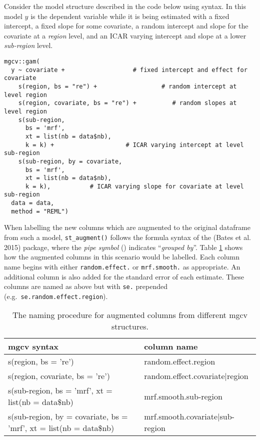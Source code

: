 Consider the model structure described in the code below using  syntax. In this model \(y\) is the dependent variable while it is being estimated with a fixed intercept, a fixed slope for some covariate, a random intercept and slope for the covariate at a \emph{region} level, and an ICAR varying intercept and slope at a lower \emph{sub-region} level.

\begin{verbatim}
mgcv::gam(
  y ~ covariate +                   # fixed intercept and effect for covariate  
    s(region, bs = "re") +                  # random intercept at level region
    s(region, covariate, bs = "re") +          # random slopes at level region
    s(sub-region, 
      bs = 'mrf',
      xt = list(nb = data$nb), 
      k = k) +                    # ICAR varying intercept at level sub-region
    s(sub-region, by = covariate, 
      bs = 'mrf',
      xt = list(nb = data$nb), 
      k = k),           # ICAR varying slope for covariate at level sub-region
  data = data, 
  method = "REML")
\end{verbatim}

When labelling the new columns which are augmented to the original dataframe from such a model, \texttt{st\_augment()} follows the formula syntax of the  (Bates et al. 2015) package, where the \emph{pipe symbol} (\texttt{\textbar{}}) indicates ``\emph{grouped by}''. Table \ref{tab:staugtab-latex} shows how the augmented columns in this scenario would be labelled. Each column name begins with either \texttt{random.effect.} or \texttt{mrf.smooth.} as appropriate. An additional column is also added for the standard error of each estimate. These columns are named as above but with \texttt{se.} prepended (e.g.~\texttt{se.random.effect.region}).

\begin{table}

\caption{\label{tab:staugtab-latex}The naming procedure for augmented columns from different mgcv structures.}
\centering
\fontsize{9}{11}\selectfont
\begin{tabular}[t]{l|l}
\hline
mgcv syntax & column name\\
\hline
s(region, bs = 're') & random.effect.region\\
\hline
s(region, covariate, bs = 're') & random.effect.covariate|region\\
\hline
s(sub-region, bs = 'mrf', xt = list(nb = data\$nb) & mrf.smooth.sub-region\\
\hline
s(sub-region, by = covariate, bs = 'mrf', xt = list(nb = data\$nb) & mrf.smooth.covariate|sub-region\\
\hline
\end{tabular}
\end{table}

